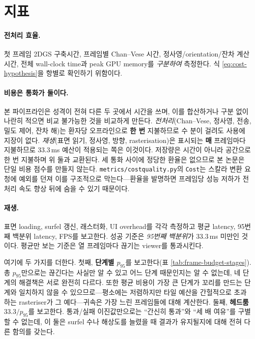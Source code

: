 \section{지표}
\label{sec:metrics}

\paragraph{전처리 효율.}
첫 프레임 2DGS 구축시간, 프레임별 Chan--Vese 시간, 정사영/orientation/잔차 계산시간,
전체 wall-clock time과 peak GPU memory를 \emph{구분하여} 측정한다. 식
\eqref{eq:cost-hypothesis}을 항별로 확인하기 위함이다.

\paragraph{비용은 통화가 둘이다.}
본 파이프라인은 성격이 전혀 다른 두 곳에서 시간을 쓰며, 이를 합산하거나 구분 없이 나란히
적으면 비교 불가능한 것을 비교하게 만든다. \emph{전처리}(Chan--Vese, 정사영, 전송, 밀도
제어, 잔차 해)는 환자당 오프라인으로 \textbf{한 번} 지불하므로 수 분이 걸려도 사용에
지장이 없다. \emph{재생}(표면 읽기, 정사영, 방향, rasterisation)은 표시되는 \textbf{매}
프레임마다 지불하므로 33.3\,ms 예산이 적용되는 쪽은 이것이다. 저장량은 시간이 아니라
공간으로 한 번 지불하며 위 둘과 교환된다. 세 통화 사이에 정당한 환율은 없으므로 본 논문은
단일 비용 점수를 만들지 않는다. \texttt{metrics/costquality.py}의 \texttt{Cost}는
스칼라 변환 요청에 예외를 던져 이를 구조적으로 막는다---환율을 발명하면 프레임당 성능
저하가 전처리 속도 향상 뒤에 숨을 수 있기 때문이다.

\paragraph{재생.}
표면 loading, surfel 갱신, 래스터화, UI overhead를 각각 측정하고 평균 latency, 95번째
백분위 latency, FPS를 보고한다. 성공 기준은 \emph{95번째 백분위}가 33.3\,ms 미만인
것이다. 평균만 보는 기준은 열 프레임마다 끊기는 viewer를 통과시킨다.

여기에 두 가지를 더한다. 첫째, \textbf{단계별 $p_{95}$}를 보고한다(표
\ref{tab:frame-budget-stages}). 총 $p_{95}$만으로는 끊긴다는 사실만 알 수 있고 어느 단계
때문인지는 알 수 없는데, 네 단계의 해결책은 서로 완전히 다르다. 또한 평균 비용이 가장 큰
단계가 꼬리를 만드는 단계와 일치하지 않을 수 있으므로---평소에는 저렴하지만 타일 예산을
간헐적으로 초과하는 rasteriser가 그 예다---귀속은 가장 느린 프레임들에 대해 계산한다.
둘째, \textbf{헤드룸} $33.3/p_{95}$를 보고한다. 통과/실패 이진값만으로는 ``간신히
통과''와 ``세 배 여유''를 구별할 수 없는데, 이 둘은 surfel 수나 해상도를 늘렸을 때 결과가
유지될지에 대해 전혀 다른 함의를 갖는다.

